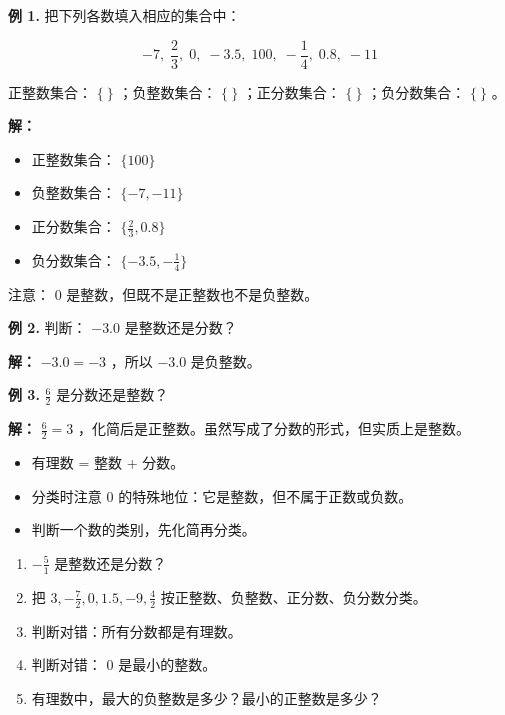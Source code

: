 \begin{workedexamples}


\textbf{例 1.} 把下列各数填入相应的集合中：

\[
-7,\; \frac{2}{3},\; 0,\; -3.5,\; 100,\; -\frac{1}{4},\; 0.8,\; -11
\]


正整数集合： $\{\ \}$ ；负整数集合： $\{\ \}$ ；正分数集合： $\{\ \}$ ；负分数集合： $\{\ \}$ 。

\textbf{解：}

\begin{itemize}
  \item 正整数集合： $\{100\}$
  \item 负整数集合： $\{-7, -11\}$
  \item 正分数集合： $\{\frac{2}{3}, 0.8\}$
  \item 负分数集合： $\{-3.5, -\frac{1}{4}\}$
\end{itemize}


注意： $0$ 是整数，但既不是正整数也不是负整数。

\textbf{例 2.} 判断： $-3.0$ 是整数还是分数？

\textbf{解：} $-3.0 = -3$ ，所以 $-3.0$ 是负整数。

\textbf{例 3.} $\frac{6}{2}$ 是分数还是整数？

\textbf{解：} $\frac{6}{2} = 3$ ，化简后是正整数。虽然写成了分数的形式，但实质上是整数。

\end{workedexamples}

\begin{keytakeaway}


\begin{itemize}
  \item 有理数 = 整数 + 分数。
  \item 分类时注意 $0$ 的特殊地位：它是整数，但不属于正数或负数。
  \item 判断一个数的类别，先化简再分类。
\end{itemize}


\end{keytakeaway}

\begin{practice}


\begin{enumerate}
  \item $-\frac{5}{1}$ 是整数还是分数？
  \item 把 $3, -\frac{7}{2}, 0, 1.5, -9, \frac{4}{2}$ 按正整数、负整数、正分数、负分数分类。
  \item 判断对错：所有分数都是有理数。
  \item 判断对错： $0$ 是最小的整数。
  \item 有理数中，最大的负整数是多少？最小的正整数是多少？
\end{enumerate}


\end{practice}

